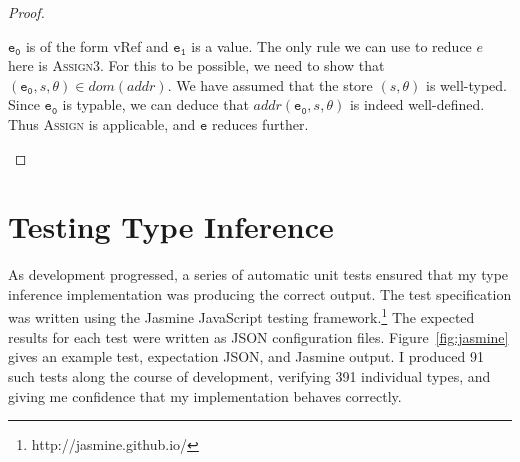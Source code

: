\documentclass[12pt,a4paper,twoside,openright]{report}
\theoremstyle{definition}
\theoremstyle{dotless}
\newcommand{\typable}[2][ ]{\Gamma{}\vdash\mathtt{#2}\, |_C#1\:\Gamma#1'}
\newcommand{\indHyp}{\Phi(\Gamma, m, C, \Gamma')}
\begin{document}
\begin{proof}
\begin{case}[AssignType]
	\begin{subcase}
	  $\mathtt{e_0}$ is of the form vRef and $\mathtt{e_1}$ is a value.
	  The only rule we can use to reduce $e$ here is \textsc{Assign3}. For this
	  to be possible, we need to show that $(\mathtt{e_0}, s, \theta) \in dom(addr)$.
	  We have assumed that the store $(s,\theta)$ is well-typed. Since $\mathtt{e_0}$ is typable, 
	  we can deduce that $addr(\mathtt{e_0},s,\theta)$
	  is indeed well-defined. Thus \textsc{Assign} is applicable, and $\mathtt{e}$
	  reduces further.  
	\end{subcase}

  \end{case}

\end{proof}



\newpage
\section{Testing Type Inference}

As development progressed, a series of automatic unit tests ensured that my
type inference implementation was producing the correct output.  The test
specification was written using the Jasmine JavaScript testing
framework.\footnote{http://jasmine.github.io/} The expected results for each
test were written as JSON configuration files. Figure~\ref{fig:jasmine} gives an example
test, expectation JSON, and Jasmine output. I produced 91 such tests along the
course of development, verifying 391 individual types, and giving me confidence
that my implementation behaves correctly.
\end{document}
